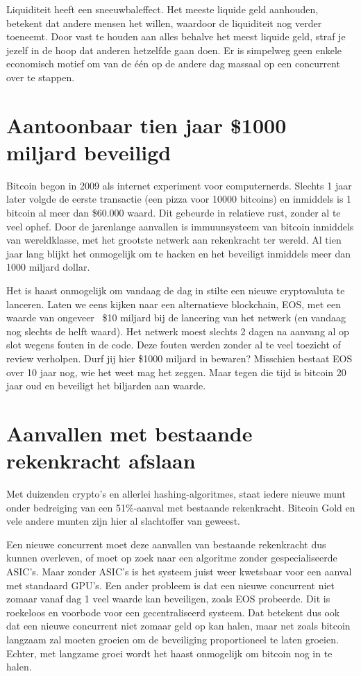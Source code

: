 Liquiditeit heeft een sneeuwbaleffect. Het meeste liquide geld aanhouden, betekent dat andere mensen het willen, waardoor de liquiditeit nog verder toeneemt. Door vast te houden aan alles behalve het meest liquide geld, straf je jezelf in de hoop dat anderen hetzelfde gaan doen. Er is simpelweg geen enkele economisch motief om van de één op de andere dag massaal op een concurrent over te stappen.

\section{Aantoonbaar tien jaar \$1000 miljard beveiligd}

Bitcoin begon in 2009 als internet experiment voor computernerds. Slechts 1 jaar later volgde de eerste transactie (een pizza voor 10000 bitcoins) en inmiddels is 1 bitcoin al meer dan \$60.000 waard. Dit gebeurde in relatieve rust, zonder al te veel ophef. Door de jarenlange aanvallen is immuunsysteem van bitcoin inmiddels van wereldklasse, met het grootste netwerk aan rekenkracht ter wereld. Al tien jaar lang blijkt het onmogelijk om te hacken en het beveiligt inmiddels meer dan 1000 miljard dollar.

Het is haast onmogelijk om vandaag de dag in stilte een nieuwe cryptovaluta te lanceren. Laten we eens kijken naar een alternatieve blockchain, EOS, met een waarde van ongeveer ~\$10 miljard bij de lancering van het netwerk (en vandaag nog slechts de helft waard). Het netwerk moest slechts 2 dagen na aanvang al op slot wegens fouten in de code. Deze fouten werden zonder al te veel toezicht of review verholpen. Durf jij hier \$1000 miljard in bewaren? Misschien bestaat EOS over 10 jaar nog, wie het weet mag het zeggen. Maar tegen die tijd is bitcoin 20 jaar oud en beveiligt het biljarden aan waarde.  

\section{Aanvallen met bestaande rekenkracht afslaan}

Met duizenden crypto's en allerlei hashing-algoritmes, staat iedere nieuwe munt onder bedreiging van een 51\%-aanval met bestaande rekenkracht. Bitcoin Gold en vele andere munten zijn hier al slachtoffer van geweest.

Een nieuwe concurrent moet deze aanvallen van bestaande rekenkracht dus kunnen overleven, of moet op zoek naar een algoritme zonder gespecialiseerde ASIC's. Maar zonder ASIC's is het systeem juist weer kwetsbaar voor een aanval met standaard GPU's. Een ander probleem is dat een nieuwe concurrent niet zomaar vanaf dag 1 veel waarde kan beveiligen, zoals EOS probeerde. Dit is roekeloos en voorbode voor een gecentraliseerd systeem. Dat betekent dus ook dat een nieuwe concurrent niet zomaar geld op kan halen, maar net zoals bitcoin langzaam zal moeten groeien om de beveiliging proportioneel te laten groeien. Echter, met langzame groei wordt het haast onmogelijk om bitcoin nog in te halen. 

